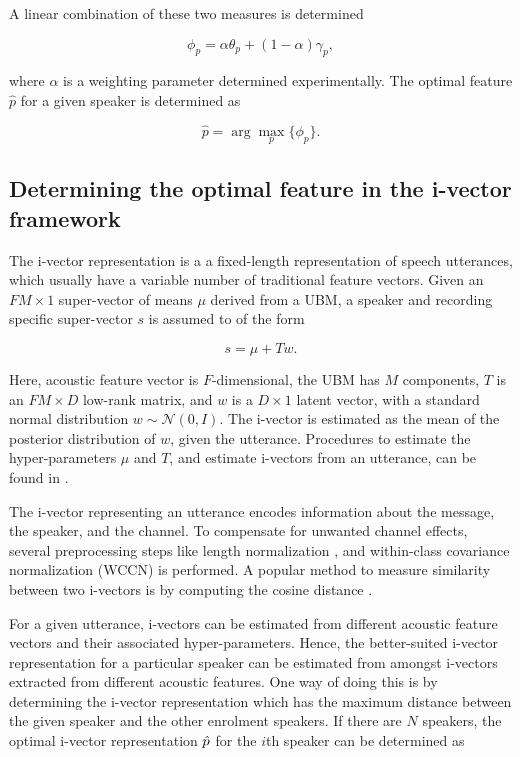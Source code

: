\documentclass{article}
\begin{document}
A linear combination of these two measures is determined 

\begin{equation}
\phi_p = \alpha \theta_p  + (1-\alpha) \gamma_p,
\label{eq:phiFunc}
\end{equation}

where $\alpha$ is a weighting parameter determined experimentally. The optimal
feature $\hat{p}$ for a given speaker is determined as 

\begin{equation}
\hat{p} = \arg\max_p \{\phi_p\}.
\label{eq:ubm_optFeat}
\end{equation}

\subsection{Determining the optimal feature in the i-vector framework}
\label{subsec:ivec_optFeat}

The i-vector representation \cite{dehak_ivector} is a a fixed-length
representation of speech utterances, which usually have a variable number of
traditional feature vectors.  Given an $FM \times 1$ super-vector of means $\mu$
derived from a UBM, a speaker and recording specific super-vector $s$ is assumed to of
the form

\begin{equation}
s = \mu + T w.
\end{equation}

Here, acoustic feature vector is $F$-dimensional, the UBM has $M$ components,
$T$ is an $FM \times D$ low-rank matrix, and $w$ is a $D \times 1$ latent
vector, with a standard normal distribution $w \sim \mathcal{N}(0,I)$. The
i-vector is estimated as the mean of the posterior distribution of $w$, given
the utterance. Procedures to estimate the hyper-parameters $\mu$ and $T$, and 
estimate i-vectors from an utterance, can be found in \cite{dehak_ivector}.

The i-vector representing an utterance encodes information about the message,
the speaker, and the channel. To compensate for unwanted channel effects,
several preprocessing steps like length normalization \cite{garcia_lengthNorm},
and within-class covariance normalization (WCCN) \cite{wccn} is performed. A
popular method to measure similarity between two i-vectors is by computing the
cosine distance \cite{dehak_ivector}.

For a given utterance, i-vectors can be estimated from different acoustic
feature vectors and their associated hyper-parameters. Hence, the
better-suited i-vector representation for a particular speaker can be estimated
from amongst i-vectors extracted from different acoustic features. One way of
doing this is by determining the i-vector representation which has the maximum
distance between the given speaker and the other enrolment speakers. If there
are $N$ speakers, the optimal i-vector representation $\Hat{p}$ 
for the $i$th speaker can be determined as
\end{document}
